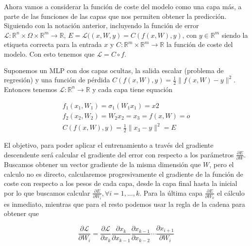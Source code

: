 Ahora vamos a considerar la función de coste del modelo como una capa más, a parte de las funciones de las capas que nos permiten obtener la predicción. Siguiendo con la notación anterior, incluyendo la función de error $\mathcal{L}: \mathbb{R}^n \times \Omega \times \mathbb{R}^m \rightarrow \mathbb{R}$, $E=\mathcal{L}((x,W,y)= C(f(x,W),y)$, con $y \in \mathbb{R}^m$ siendo la etiqueta correcta para la entrada $x$ y $C: \mathbb{R}^m \times \mathbb{R}^m \rightarrow \mathbb{R}$ la función de coste del modelo. Con esto tenemos que $\mathcal{L} = C \circ f$. 


\begin{ejemplo}
    Suponemos un MLP con dos capas ocultas, la salida escalar (problema de regresión) y una función de pérdida $C(f(x,W),y)=\frac{1}{2} \| f(x,W) - y\|^2$. Entonces tenemos $\mathcal{L}:\mathbb{R}^n \rightarrow \mathbb{R}$ y cada capa tiene equación

    
    
    \begin{gather*}
    f_1(x_1, W_1)=\sigma_1(W_1x_1)=x2 \\
      f_2(x_2, W_2)=W_2x_2=x_3=f(x,W)=o  \\
      C(f(x,W),y)= \frac{1}{2} \| x_3 - y \|^2 = E
    \end{gather*}

    


\end{ejemplo}

El objetivo, para poder aplicar el entrenamiento a través del gradiente descendente será calcular el gradiente del error con respecto a los parámetros $\frac{\partial E}{\partial W}$. Buscamos obtener un vector gradiente de la misma dimensión que $W$, pero el calculo no es directo, calcularemos progresivamente el gradiente de la función de coste con respecto a los pesos de cada capa, desde la capa final hasta la inicial por lo que buscamos calcular $\frac{\partial E}{\partial W_i}, \forall i=1,...,k$.  Para la última capa $\frac{\partial E}{\partial W_k}$ el cálculo es inmediato, mientras que para el resto podemos usar la regla de la cadena para obtener que 

$$\frac{\partial \mathcal{L}}{\partial W_i}=\frac{\partial \mathcal{L}}{\partial x_k} \frac{\partial x_k}{\partial x_{k-1}} \frac{\partial x_{k-1}}{\partial x_{k-2}} \cdots \frac{\partial x_{i+1}}{\partial W_i}$$

